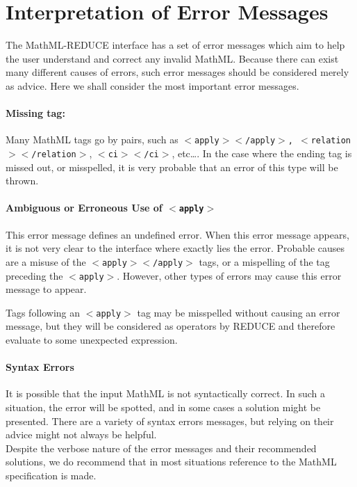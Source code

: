 \documentclass{article}
\begin{document}
\section{Interpretation of Error Messages}

The MathML-REDUCE interface has a set of error messages which aim to help the
user understand and correct any invalid MathML. Because there can exist many
different causes of errors, such error messages should be considered merely
as advice. Here we shall consider the most important error messages.

\paragraph{Missing tag:}

Many MathML tags go by pairs, such as {\tt $<$apply$>$$<$/apply$>$,
$<$relation$>$$<$/relation$>$}, {\tt $<$ci$>$$<$/ci$>$}, etc\ldots. In the
case
where the ending tag is missed out, or misspelled, it is very probable that an
error of this type will be thrown. 

\paragraph{Ambiguous or Erroneous Use of {\tt $<$apply$>$}}

This error message defines an undefined error. When this error message
appears, it is not very clear to the interface where exactly lies the error. 
Probable causes are a misuse of the {\tt $<$apply$>$$<$/apply$>$} tags, or a
mispelling of the tag preceding the {\tt $<$apply$>$}. However, other types
of errors may cause this error message to appear. 

Tags following an {\tt $<$apply$>$} tag may be misspelled without causing an
error message, but they will be considered as operators by REDUCE and
therefore evaluate to some unexpected expression.

\paragraph{Syntax Errors}

It is possible that the input MathML is not syntactically correct. In such
a situation, the error will be spotted, and in some cases a solution might be
presented. There are a variety of syntax errors messages, but relying on
their advice might not always be helpful. 
\\

Despite the verbose nature of the error messages and their recommended
solutions, we do recommend that in most situations reference to the MathML
specification is made. 
\end{document}
